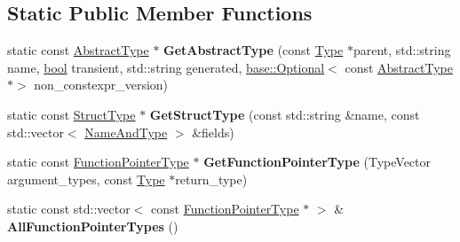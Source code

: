 \subsection*{Static Public Member Functions}
\begin{DoxyCompactItemize}
\item 
\mbox{\label{classv8_1_1internal_1_1torque_1_1TypeOracle_a67e793d4751b2f24363a86c0402226b9}} 
static const \mbox{\hyperlink{classv8_1_1internal_1_1torque_1_1AbstractType}{Abstract\+Type}} $\ast$ {\bfseries Get\+Abstract\+Type} (const \mbox{\hyperlink{classv8_1_1internal_1_1torque_1_1Type}{Type}} $\ast$parent, std\+::string name, \mbox{\hyperlink{classbool}{bool}} transient, std\+::string generated, \mbox{\hyperlink{classv8_1_1base_1_1Optional}{base\+::\+Optional}}$<$ const \mbox{\hyperlink{classv8_1_1internal_1_1torque_1_1AbstractType}{Abstract\+Type}} $\ast$$>$ non\+\_\+constexpr\+\_\+version)
\item 
\mbox{\label{classv8_1_1internal_1_1torque_1_1TypeOracle_a32b1496f6acbf082570e66ec57a64a6d}} 
static const \mbox{\hyperlink{classv8_1_1internal_1_1torque_1_1StructType}{Struct\+Type}} $\ast$ {\bfseries Get\+Struct\+Type} (const std\+::string \&name, const std\+::vector$<$ \mbox{\hyperlink{structv8_1_1internal_1_1torque_1_1NameAndType}{Name\+And\+Type}} $>$ \&fields)
\item 
\mbox{\label{classv8_1_1internal_1_1torque_1_1TypeOracle_af4ee9f9a0ea059d8b9675d0c799736a4}} 
static const \mbox{\hyperlink{classv8_1_1internal_1_1torque_1_1FunctionPointerType}{Function\+Pointer\+Type}} $\ast$ {\bfseries Get\+Function\+Pointer\+Type} (Type\+Vector argument\+\_\+types, const \mbox{\hyperlink{classv8_1_1internal_1_1torque_1_1Type}{Type}} $\ast$return\+\_\+type)
\item 
\mbox{\label{classv8_1_1internal_1_1torque_1_1TypeOracle_a1bf4023e3b9d442164949cc0c21a7511}} 
static const std\+::vector$<$ const \mbox{\hyperlink{classv8_1_1internal_1_1torque_1_1FunctionPointerType}{Function\+Pointer\+Type}} $\ast$ $>$ \& {\bfseries All\+Function\+Pointer\+Types} ()
\item 
\mbox{\label{classv8_1_1internal_1_1torque_1_1TypeOracle_a70379506698a6c7075e10e7f7bd2c8e2}} 
$$
\end{DoxyCompactItemize}
